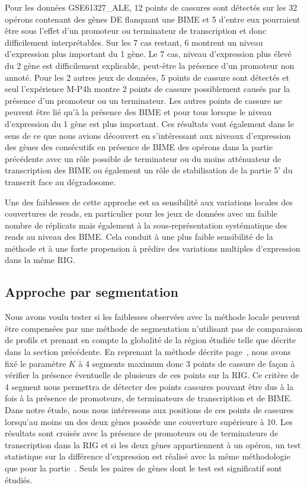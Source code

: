 \documentclass[12pt,a4paper]{report}
\begin{document}
\begin{onehalfspace}
Pour les données GSE61327\_ALE, 12 points de cassures sont détectés sur les 32 opérons contenant des gènes DE flanquant une BIME et 5 d'entre eux pourraient être sous l'effet d'un promoteur ou terminateur de transcription et donc difficilement interprétables. Sur les 7 cas restant, 6 montrent un niveau d'expression plus important du 1 gène. Le 7 cas, niveau d'expression plus élevé du 2 gène est difficilement explicable, peut-être la présence d'un promoteur non annoté. Pour les 2 autres jeux de données, 5 points de cassure sont détectés et seul l'expérience M-P4h montre 2 points de cassure possiblement causés par la présence d'un promoteur ou un terminateur. Les autres points de cassure ne peuvent être lié qu'à la présence des BIME et pour tous lorsque le niveau d'expression du 1 gène est plus important.
Ces résultats vont également dans le sens de ce que nous avions découvert en s'intéressant aux niveaux d'expression des gènes des consécutifs en présence de BIME des opérons dans la partie précédente avec un rôle possible de terminateur ou du moins atténuateur de transcription des BIME ou également un rôle de stabilisation de la partie 5' du transcrit face au dégradosome.

Une des faiblesses de cette approche est sa sensibilité aux variations locales des couvertures de reads, en particulier pour les jeux de données avec un faible nombre de réplicats mais également à la sous-représentation systématique des reads au niveau des BIME. Cela conduit à une plus faible sensibilité de la méthode et à une forte propension à prédire des variations multiples d’expression dans la même RIG.

\subsection*{Approche par segmentation}

Nous avons voulu tester si les faiblesses observées avec la méthode locale peuvent être compensées par une méthode de segmentation n'utilisant pas de comparaison de profils et prenant en compte la globalité de la région étudiée telle que décrite dans la section précédente.
En reprenant la méthode décrite page~\pageref{methode_segmentation}, nous avons fixé le paramètre $K$ à 4 segments maximum donc 3 points de cassure de façon à vérifier la présence éventuelle de plusieurs de ces points sur la RIG. Ce critère de 4 segment nous permettra de détecter des points cassures pouvant être dus à la fois à la présence de promoteurs, de terminateurs de transcription et de BIME. 
Dans notre étude, nous nous intéressons aux positions de ces points de cassures lorsqu'au moins un des deux gènes possède une couverture supérieure à 10. Les résultats sont croisés avec la présence de promoteurs ou de terminateurs de transcription dans la RIG et si les deux gènes appartiennent à un opéron, un test  statistique sur la différence d'expression est réalisé avec la même méthodologie que pour la partie~. Seuls les paires de gènes dont le test est significatif sont étudiés.


\end{onehalfspace}
\end{document}

